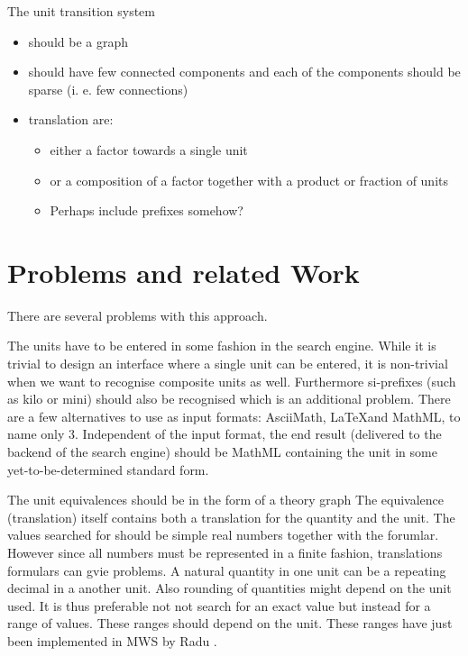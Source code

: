 \documentclass[11pt]{article}
\begin{document}
The unit transition system 
\begin{itemize}
  \item should be a graph
  \item should have few connected components and each of the components should be sparse (i. e. few connections)
  \item translation are:
  \begin{itemize}
    \item either a factor towards a single unit
    \item or a composition of a factor together with a product or fraction of units 
    \item Perhaps include prefixes somehow?
  \end{itemize}
\end{itemize}

\section{Problems and related Work}
\label{sec:problems_relatedwork}

There are several problems with this approach. 

The units have to be entered in some fashion in the search engine. While it is trivial to design an interface where a single unit can be entered, it is non-trivial when we want to recognise composite units as well. Furthermore si-prefixes (such as kilo or mini) should also be recognised which is an additional problem. There are a few alternatives to use as input formats: AsciiMath, \LaTeX and MathML, to name only 3. Independent of the input format, the end result (delivered to the backend of the search engine) should be MathML containing the unit in some yet-to-be-determined standard form.

The unit equivalences should be in the form of a theory graph  The equivalence
(translation) itself contains both a translation for the quantity and the unit. The values searched for should be simple real numbers together with the forumlar. However since all numbers must be represented in a finite fashion, translations formulars can gvie problems. A natural quantity in one unit can be a repeating decimal in a another unit. Also rounding of quantities might depend on the unit used. It is thus preferable not not search for an exact value but instead for a range of values. These ranges should depend on the unit. These ranges have just been implemented in MWS by Radu .  
\end{document}
